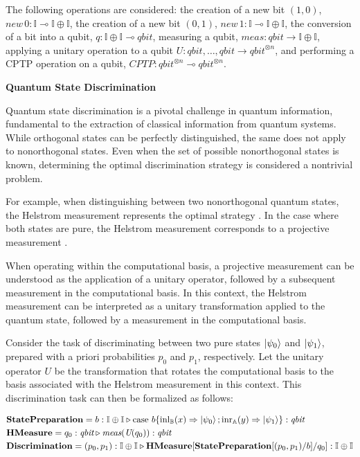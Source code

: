 \documentclass[10pt,a4paper]{amsart}
\theoremstyle{definition}
\theoremstyle{definition}
\theoremstyle{definition}
\theoremstyle{definition}
\theoremstyle{definition}
\theoremstyle{definition}
\begin{document}
    The following operations are considered: the creation of a new bit $(1,0)$, $\textit{new} \hspace{2pt} 0  :\mathbb{I}  \multimap \mathbb{I} \oplus \mathbb{I} $, the creation of a new bit $(0,1)$, $\textit{new} \hspace{2pt} 1  :\mathbb{I}  \multimap \mathbb{I} \oplus \mathbb{I}$, the conversion of a bit into a qubit, $q : \mathbb{I} \oplus \mathbb{I}  \multimap \textit{qbit}$, measuring a qubit, $\textit{meas}:\textit{qbit} \xrightarrow{} \mathbb{I} \oplus \mathbb{I}$, applying a unitary  operation to a qubit $\textit{U}:\textit{qbit},\ldots,\textit{qbit} \xrightarrow{} \textit{qbit}^{\otimes n}$, and performing a CPTP operation on a qubit, $\textit{CPTP}: \textit{qbit}^{\otimes n} \multimap \textit{qbit}^{\otimes n}$. 


    \textbf{Quantum State Discrimination}


Quantum state discrimination is a pivotal challenge in quantum information, fundamental to the extraction of classical information from quantum systems. While orthogonal states can be perfectly distinguished, the same does not apply to nonorthogonal states. 
Even when the set of possible nonorthogonal states is known, determining the optimal discrimination strategy is considered a nontrivial problem.

For example, when distinguishing between two nonorthogonal quantum states, the Helstrom measurement represents the optimal strategy \cite{helstromQuantumDetectionEstimation1976}. In the case where both states are pure, the Helstrom measurement corresponds to a projective measurement \cite{barnett2009quantum}.

When operating within the computational basis, a projective measurement can be understood as the application of a unitary operator, followed by a subsequent measurement in the computational basis. In this context, the Helstrom measurement can be interpreted as a unitary transformation applied to the quantum state, followed by a measurement in the computational basis. 

Consider the task of discriminating between two pure states $\ket{\psi_0}$ and $\ket{\psi_1}$, prepared with a priori probabilities $p_0$ and $p_1$, respectively. Let the unitary operator $U$  be the transformation that rotates the computational basis to the basis associated with the Helstrom measurement  in this context. This discrimination task can then be formalized as follows:

\begin{align*}
  &\textbf{StatePreparation} =  b:\mathbb{I} \oplus \mathbb{I}  \triangleright  \text{case } b \{\text{inl}_{\mathbb{B}}(x) \Rightarrow \ket{\psi_0} ; \text{inr}_{\mathbb{A}}(y) \Rightarrow \ket{\psi_1}\}: \textit{qbit} \\
  &\textbf{HMeasure} =  q_0: \textit{qbit} \triangleright \textit{meas} (\textit{U}(q_0))  : \textit{qbit} \\
  &\textbf{Discrimination} = (p_0,p_1): \mathbb{I} \oplus \mathbb{I}  \triangleright \textbf{HMeasure} [ \textbf{StatePreparation} [(p_0,p_1)/ b] / q_0] : \mathbb{I} \oplus \mathbb{I}
\end{align*}
\end{document}
